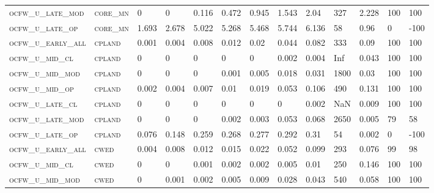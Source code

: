 \begin{landscape}
\begin{center}
\begin{footnotesize}
\begin{longtable}{lllllllllllll}
\textsc{ocfw\_u\_late\_mod } & \textsc{core\_mn  }   & 0        & 0        & 0.116    & 0.472    & 0.945    & 1.543    & 2.04      & 327    & 2.228         & 100           & 100      \\
\textsc{ocfw\_u\_late\_op  } & \textsc{core\_mn  }   & 1.693    & 2.678    & 5.022    & 5.268    & 5.468    & 5.744    & 6.136     & 58     & 0.96          & 0             & -100     \\
\textsc{ocfw\_u\_early\_all} & \textsc{cpland    }   & 0.001    & 0.004    & 0.008    & 0.012    & 0.02     & 0.044    & 0.082     & 333    & 0.09          & 100           & 100      \\
\textsc{ocfw\_u\_mid\_cl   } & \textsc{cpland    }   & 0        & 0        & 0        & 0        & 0        & 0.002    & 0.004     & Inf    & 0.043         & 100           & 100      \\
\textsc{ocfw\_u\_mid\_mod  } & \textsc{cpland    }   & 0        & 0        & 0        & 0.001    & 0.005    & 0.018    & 0.031     & 1800   & 0.03          & 100           & 100      \\
\textsc{ocfw\_u\_mid\_op   } & \textsc{cpland    }   & 0.002    & 0.004    & 0.007    & 0.01     & 0.019    & 0.053    & 0.106     & 490    & 0.131         & 100           & 100      \\
\textsc{ocfw\_u\_late\_cl  } & \textsc{cpland    }   & 0        & 0        & 0        & 0        & 0        & 0        & 0.002     & NaN    & 0.009         & 100           & 100      \\
\textsc{ocfw\_u\_late\_mod } & \textsc{cpland    }   & 0        & 0        & 0        & 0.002    & 0.003    & 0.053    & 0.068     & 2650   & 0.005         & 79            & 58       \\
\textsc{ocfw\_u\_late\_op  } & \textsc{cpland    }   & 0.076    & 0.148    & 0.259    & 0.268    & 0.277    & 0.292    & 0.31      & 54     & 0.002         & 0             & -100     \\
\textsc{ocfw\_u\_early\_all} & \textsc{cwed      }   & 0.004    & 0.008    & 0.012    & 0.015    & 0.022    & 0.052    & 0.099     & 293    & 0.076         & 99            & 98       \\
\textsc{ocfw\_u\_mid\_cl   } & \textsc{cwed      }   & 0        & 0        & 0.001    & 0.002    & 0.002    & 0.005    & 0.01      & 250    & 0.146         & 100           & 100      \\
\textsc{ocfw\_u\_mid\_mod  } & \textsc{cwed      }   & 0        & 0.001    & 0.002    & 0.005    & 0.009    & 0.028    & 0.043     & 540    & 0.058         & 100           & 100      \\

\end{longtable}
\end{footnotesize}
\end{center}
\end{landscape}
